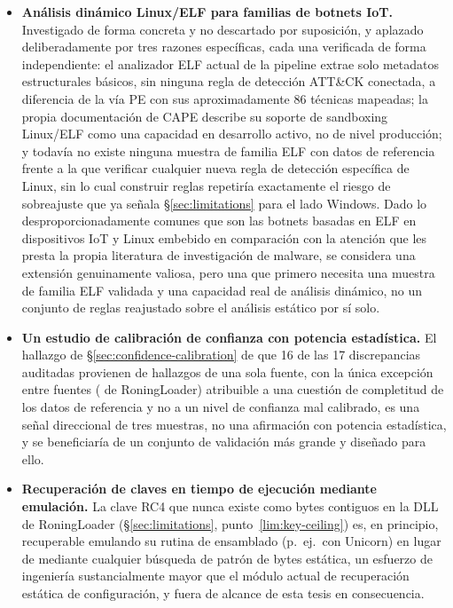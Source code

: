 \begin{itemize}
\item \textbf{An\'alisis din\'amico Linux/ELF para familias de botnets
  IoT.} Investigado de forma concreta y no descartado por suposici\'on,
  y aplazado deliberadamente por tres razones espec\'ificas, cada una
  verificada de forma independiente: el analizador ELF actual de la
  pipeline extrae solo metadatos estructurales b\'asicos, sin ninguna
  regla de detecci\'on ATT\&CK conectada, a diferencia de la v\'ia PE
  con sus aproximadamente 86 t\'ecnicas mapeadas; la propia
  documentaci\'on de CAPE describe su soporte de sandboxing Linux/ELF
  como una capacidad en desarrollo activo, no de nivel producci\'on; y
  todav\'ia no existe ninguna muestra de familia ELF con datos de
  referencia frente a la que verificar cualquier nueva regla de
  detecci\'on espec\'ifica de Linux, sin lo cual construir reglas
  repetir\'ia exactamente el riesgo de sobreajuste que ya se\~nala
  \S\ref{sec:limitations} para el lado Windows. Dado lo
  desproporcionadamente comunes que son las botnets basadas en ELF en
  dispositivos IoT y Linux embebido en comparaci\'on con la atenci\'on
  que les presta la propia literatura de investigaci\'on de malware,
  se considera una extensi\'on genuinamente valiosa, pero una que
  primero necesita una muestra de familia ELF validada y una capacidad
  real de an\'alisis din\'amico, no un conjunto de reglas reajustado
  sobre el an\'alisis est\'atico por s\'i solo.

\item \textbf{Un estudio de calibraci\'on de confianza con potencia
  estad\'istica.} El hallazgo de \S\ref{sec:confidence-calibration} de
  que 16 de las 17 discrepancias auditadas provienen de hallazgos de
  una sola fuente, con la \'unica excepci\'on entre fuentes
  ( de RoningLoader) atribuible a una cuesti\'on de
  completitud de los datos de referencia y no a un nivel de confianza
  mal calibrado, es una se\~nal direccional de tres muestras, no una
  afirmaci\'on con potencia estad\'istica, y se beneficiar\'ia de un
  conjunto de validaci\'on m\'as grande y dise\~nado para ello.

\item \textbf{Recuperaci\'on de claves en tiempo de ejecuci\'on
  mediante emulaci\'on.} La clave RC4 que nunca existe como bytes
  contiguos en la DLL de RoningLoader (\S\ref{sec:limitations},
  punto~\ref{lim:key-ceiling}) es, en principio, recuperable emulando su rutina de
  ensamblado (p.\ ej.\ con Unicorn) en lugar de mediante cualquier
  b\'usqueda de patr\'on de bytes est\'atica, un esfuerzo de
  ingenier\'ia sustancialmente mayor que el m\'odulo actual de
  recuperaci\'on est\'atica de configuraci\'on, y fuera de alcance de
  esta tesis en consecuencia.

\end{itemize}
